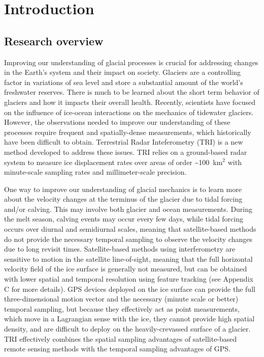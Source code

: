 \chapter{Introduction}
\label{ch:intro}
\section{Research overview}
Improving our understanding of glacial processes is crucial for addressing changes in 
the Earth's system and their impact on society. Glaciers are a controlling factor in variations of sea level and store a substantial amount of the world's freshwater reserves. There is much to be learned about the short term behavior of glaciers and how it impacts their overall health.
Recently, scientists have focused on the influence of ice-ocean interactions on the mechanics of tidewater glaciers. However,  the observations needed to improve our understanding of these processes require frequent and spatially-dense measurements, which historically have been difficult to obtain. Terrestrial Radar Inteferometry  (TRI) is a new method developed to address these issues. TRI relies on a ground-based radar system to measure ice displacement rates over areas of order \textasciitilde100~km$^2$ with minute-scale sampling rates and millimeter-scale precision. 


One way to improve our understanding of glacial mechanics is to learn more about the velocity changes at the terminus of the glacier due to tidal forcing and/or calving. This may involve both glacier and ocean measurements. During the melt season, calving events may occur every few days, while tidal forcing occurs over diurnal and semidiurnal scales, meaning that satellite-based methods do not provide the necessary temporal sampling to observe the velocity changes due to long revisit times. Satellite-based methods using interferometry are sensitive to motion in the satellite line-of-sight, meaning that the full horizontal velocity field of the ice surface is generally not measured, but can be obtained with lower spatial and temporal resolution using feature tracking (see Appendix C for more details). GPS devices deployed on the ice surface can provide the full three-dimensional motion vector and the necessary (minute scale or better) temporal sampling, but because they effectively act as point measurements, which move in a Lagrangian sense with the ice, they cannot provide high spatial density, and are difficult to deploy on the heavily-crevassed surface of a glacier. TRI effectively combines the spatial sampling advantages of satellite-based remote sensing methods with the temporal sampling advantages of GPS.


